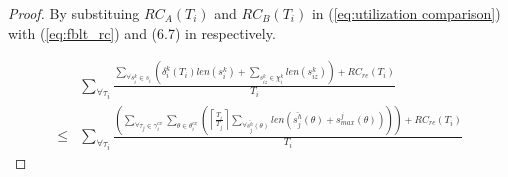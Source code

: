 \documentclass[12pt,english]{report}
\newtheorem{proof}{Proof}
\begin{document}
\begin{proof}

By substituing $RC_{A}(T_{i})$ and $RC_{B}(T_{i})$ in (\ref{eq:utilization comparison})
with (\ref{eq:fblt_rc}) and (6.7) in \cite{shambake_phd_proposal}
respectively. 

\begin{eqnarray}
 & \sum_{\forall\tau_{i}}\frac{\sum_{\forall s_{i}^{k}\in s_{i}}\left(\delta_{i}^{k}(T_{i})len(s_{i}^{k})+\sum_{s_{iz}^k\in \chi_i^k} len(s_{iz}^{k})\right)+RC_{re}(T_{i})}{T_{i}}\label{eq:fblt_edf_comparison_1}\\
\le & \sum_{\forall\tau_{i}}\frac{\left(\sum_{\forall\tau_{j}\in\gamma_{i}^{ex}}\sum_{\theta\in\theta_{i}^{ex}}\left(\left\lceil \frac{T_{i}}{T_{j}}\right\rceil \sum_{\forall\bar{s_{j}^{h}}(\theta)}len\left(\bar{s_{j}^{h}}(\theta)+s_{max}^{j}(\theta)\right)\right)\right)+RC_{re}(T_{i})}{T_{i}}\nonumber 
\end{eqnarray}



\end{proof}
\end{document}
